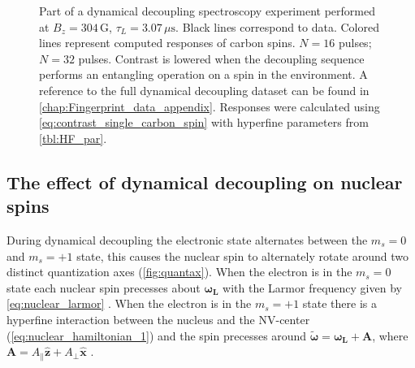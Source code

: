 \begin{figure}[htbp]
\begin{subfigure}[t]{\textwidth}
    \caption{}
    \label{fig:FP32}
    \end{subfigure}
    \caption{Part of a dynamical decoupling spectroscopy experiment performed at $B_z = 304\,\mathrm{G}$, $\tau_L =3.07 \, \mu \mathrm{s} $.
    Black lines correspond to data. Colored lines represent computed responses of carbon spins.
     $N = 16$ pulses;  $N=32$ pulses.
    Contrast is lowered when the decoupling sequence performs an entangling operation on a spin in the environment.
    A reference to the full dynamical decoupling dataset can be found in \cref{chap:Fingerprint_data_appendix}.
    Responses were calculated using \cref{eq:contrast_single_carbon_spin} with hyperfine parameters from \cref{tbl:HF_par}. }
    \label{fig:FP}
\end{figure}





\subsection{The effect of dynamical decoupling on nuclear spins}

During dynamical decoupling the electronic state alternates between the $m_s = 0$ and $m_s =+1$ state, this causes the nuclear spin to alternately rotate around two distinct quantization axes (\cref{fig:quantax}).
When the electron is in the $m_s=0$ state each nuclear spin precesses about $\bm{\omega_L}$ with the Larmor frequency given by \cref{eq:nuclear_larmor} .
When the electron is in the $m_s=+1$ state there is a hyperfine interaction between the nucleus and the NV-center (\cref{eq:nuclear_hamiltonian_1}) and the spin precesses around $\bm{\tilde{\omega}}=\bm{\omega_L} +\bm{A}$, where $\bm{A} = A_\parallel \bm{\hat{z}} + A_\perp \bm{\hat{x}}$ \citep{Taminiau2012Detection}.


